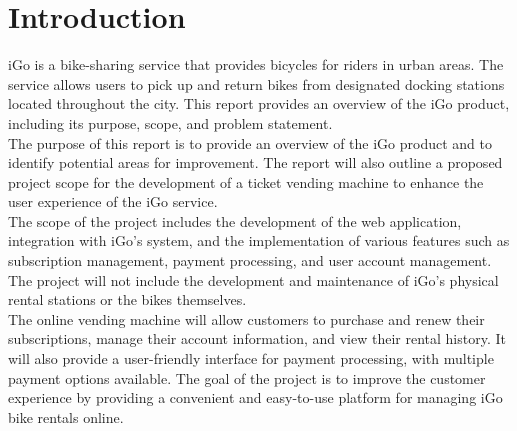 \chapter{Introduction}
iGo is a bike-sharing service that provides bicycles for riders in urban areas. The service allows users to pick up and return bikes from designated docking stations located throughout the city. This report provides an overview of the iGo product, including its purpose, scope, and problem statement.\\

The purpose of this report is to provide an overview of the iGo product and to identify potential areas for improvement. The report will also outline a proposed project scope for the development of a ticket vending machine to enhance the user experience of the iGo service.\\

The scope of the project includes the development of the web application, integration with iGo's system, and the implementation of various features such as subscription management, payment processing, and user account management. The project will not include the development and maintenance of iGo's physical rental stations or the bikes themselves.\\

The online vending machine will allow customers to purchase and renew their subscriptions, manage their account information, and view their rental history. It will also provide a user-friendly interface for payment processing, with multiple payment options available.
The goal of the project is to improve the customer experience by providing a convenient and easy-to-use platform for managing iGo bike rentals online.

